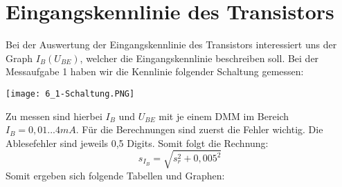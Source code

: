 

\section{Eingangskennlinie des Transistors}
Bei der Auswertung der Eingangskennlinie des Transistors interessiert uns der Graph $I_B(U_{BE})$, welcher die Eingangskennlinie beschreiben soll. Bei der Messaufgabe 1 haben wir die Kennlinie folgender Schaltung gemessen:
\begin{center}
    \texttt{[image: 6\_1-Schaltung.PNG]}
\end{center}
Zu messen sind hierbei $I_B$ und $U_{BE}$ mit je einem DMM im Bereich $I_B=0,01...4mA$. Für die Berechnungen sind zuerst die Fehler wichtig. Die Ablesefehler sind jeweils 0,5 Digits. Somit folgt die Rechnung:
\begin{equation}
    s_{I_B}=\sqrt{s_r^2+0,005^2}
\end{equation}
\newpage
Somit ergeben sich folgende Tabellen und Graphen:
